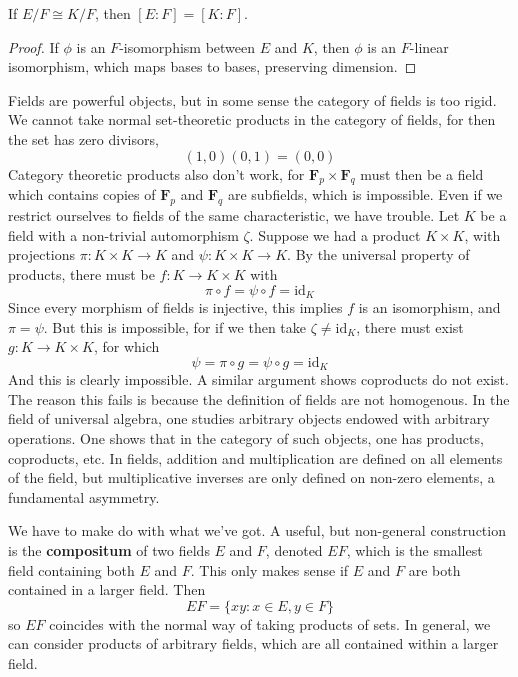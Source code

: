 \begin{lemma}
    If $E/F \cong K/F$, then $[E:F] = [K:F]$.
\end{lemma}
\begin{proof}
    If $\phi$ is an $F$-isomorphism between $E$ and $K$, then $\phi$ is an $F$-linear isomorphism, which maps bases to bases, preserving dimension.
\end{proof}

Fields are powerful objects, but in some sense the category of fields is too rigid. We cannot take normal set-theoretic products in the category of fields, for then the set has zero divisors,
%
\[ (1,0)(0,1) = (0,0) \]
%
Category theoretic products also don't work, for $\mathbf{F}_p \times \mathbf{F}_q$ must then be a field which contains copies of $\mathbf{F}_p$ and $\mathbf{F}_q$ are subfields, which is impossible. Even if we restrict ourselves to fields of the same characteristic, we have trouble. Let $K$ be a field with a non-trivial automorphism $\zeta$. Suppose we had a product $K \times K$, with projections $\pi: K \times K \to K$ and $\psi: K \times K \to K$. By the universal property of products, there must be $f: K \to K \times K$ with
%
\[ \pi \circ f = \psi \circ f = \text{id}_K \]
%
Since every morphism of fields is injective, this implies $f$ is an isomorphism, and $\pi = \psi$. But this is impossible, for if we then take $\zeta \neq \text{id}_K$, there must exist $g: K \to K \times K$, for which
%
\[ \psi = \pi \circ g = \psi \circ g = \text{id}_K \]
%
And this is clearly impossible. A similar argument shows coproducts do not exist. The reason this fails is because the definition of fields are not homogenous. In the field of universal algebra, one studies arbitrary objects endowed with arbitrary operations. One shows that in the category of such objects, one has products, coproducts, etc. In fields, addition and multiplication are defined on all elements of the field, but multiplicative inverses are only defined on non-zero elements, a fundamental asymmetry.

We have to make do with what we've got. A useful, but non-general construction is the {\bf compositum} of two fields $E$ and $F$, denoted $EF$, which is the smallest field containing both $E$ and $F$. This only makes sense if $E$ and $F$ are both contained in a larger field. Then
%
\[ EF = \{ xy : x \in E, y \in F \} \]
%
so $EF$ coincides with the normal way of taking products of sets. In general, we can consider products of arbitrary fields, which are all contained within a larger field.

